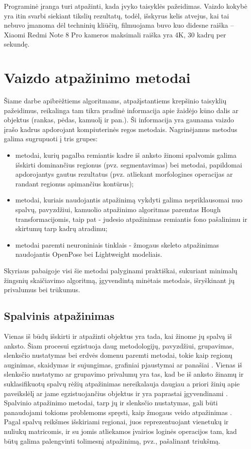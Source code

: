 \documentclass{VUMIFPSbakalaurinis}
\begin{document}
Programinė įranga turi atpažinti, kada įvyko taisyklės pažeidimas. Vaizdo kokybė yra itin svarbi siekiant tikslių rezultatų, todėl, išskyrus kelis atvejus, kai tai nebuvo įmanoma dėl techninių kliūčių, filmuojama buvo kuo didesne raiška – Xiaomi Redmi Note 8 Pro kameros maksimali raiška yra 4K, 30 kadrų per sekundę. 

\section{Vaizdo atpažinimo metodai}

Šiame darbe apibrėžtiems algoritmams, atpažįstantiems krepšinio taisyklių pažeidimus, reikalinga tam tikra pradinė informacija apie žaidėjo kūno dalis ar objektus (rankas, pėdas, kamuolį ir pan.). Ši informacija yra gaunama vaizdo įrašo kadrus apdorojant kompiuterinės regos metodais. 
Nagrinėjamus metodus galima sugrupuoti į tris grupes: 

\begin{itemize}
	\item metodai, kurių pagalba remiantis kadre iš anksto žinomi spalvomis galima išskirti dominančius regionus (pvz. segmentavimas) bei metodai, papildomai apdorojantys gautus rezultatus (pvz. atliekant morfologines operacijas ar randant regionus apimančius kontūrus);
	\item metodai, kuriais naudojantis atpažinimą vykdyti galima nepriklausomai nuo spalvų, pavyzdžiui, kamuolio atpažinimo algoritmas paremtas Hough transformacijomis, taip pat - judesio atpažinimas remiantis fono pašalinimu ir skirtumų tarp kadrų atradimu;
	\item metodai paremti neuroniniais tinklais - žmogaus skeleto atpažinimas naudojantis OpenPose bei Lightweight modeliais. 
\end{itemize}

Skyriaus pabaigoje visi šie metodai palyginami praktiškai, sukuriant minimalų žingsnių skaičiavimo algoritmą, įgyvendintą minėtais metodais, išryškinant jų privalumus bei trūkumus. 

\subsection{Spalvinis atpažinimas}
Vienas iš būdų išskirti ir atpažinti objektus yra tada, kai žinome jų spalvą iš anksto. Šiam procesui egzistuoja daug metodologijų, pavyzdžiui, grupavimas, slenksčio nustatymas bei erdvės domenu paremti metodai, tokie kaip regionų auginimas, skaidymas ir sujungimas, grafiniai pjaustymai ar panašiai \cite{segmentation_trends}. Vienas iš slenksčio nustatymo ar grupavimo privalumų yra tas, kad be iš anksto žinamų ir suklasifikuotų spalvų rėžių atpažinimas nereikalauja daugiau a priori žinių apie paveikslėlį ar jame egzistuojančius objektus ir yra paprastai įgyvendinami \cite{segmentation_trends}. Spalvinio atpažinimo metodai, tarp jų ir slenksčio nustatymas, gali būti panaudojami tokioms problemoms spręsti, kaip žmogaus veido atpažinimas \cite{WANG20011983}. Pagal spalvų reikšmes išskiriami regionai, juos reprezentuojant vienetukų ir nuliukų matricomis, ir su jomis atliekamos įvairios loginės operacijos tam, kad būtų galima palengvinti tolimesnį atpažinimą, pvz., pašalinant triukšmą. 
\end{document}
